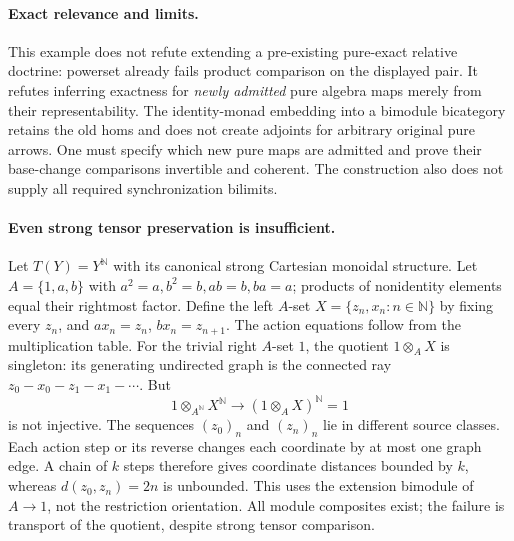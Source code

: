 \documentclass{article}
\begin{document}
\paragraph{Exact relevance and limits.} This example does not refute extending a pre-existing pure-exact relative doctrine: powerset already fails product comparison on the displayed pair. It refutes inferring exactness for \emph{newly admitted} pure algebra maps merely from their representability. The identity-monad embedding into a bimodule bicategory retains the old homs and does not create adjoints for arbitrary original pure arrows. One must specify which new pure maps are admitted and prove their base-change comparisons invertible and coherent. The construction also does not supply all required synchronization bilimits.

\paragraph{Even strong tensor preservation is insufficient.} Let $T(Y)=Y^{\mathbb N}$ with its canonical strong Cartesian monoidal structure. Let $A=\{1,a,b\}$ with $a^2=a,b^2=b,ab=b,ba=a$; products of nonidentity elements equal their rightmost factor. Define the left $A$-set $X=\{z_n,x_n:n\in\mathbb N\}$ by fixing every $z_n$, and $a x_n=z_n$, $b x_n=z_{n+1}$. The action equations follow from the multiplication table. For the trivial right $A$-set $1$, the quotient $1\otimes_A X$ is singleton: its generating undirected graph is the connected ray $z_0-x_0-z_1-x_1-\cdots$. But
\[
 1\otimes_{A^{\mathbb N}}X^{\mathbb N}\longrightarrow(1\otimes_A X)^{\mathbb N}=1
\]
is not injective. The sequences $(z_0)_n$ and $(z_n)_n$ lie in different source classes. Each action step or its reverse changes each coordinate by at most one graph edge. A chain of $k$ steps therefore gives coordinate distances bounded by $k$, whereas $d(z_0,z_n)=2n$ is unbounded. This uses the extension bimodule of $A\to1$, not the restriction orientation. All module composites exist; the failure is transport of the quotient, despite strong tensor comparison.
\end{document}

